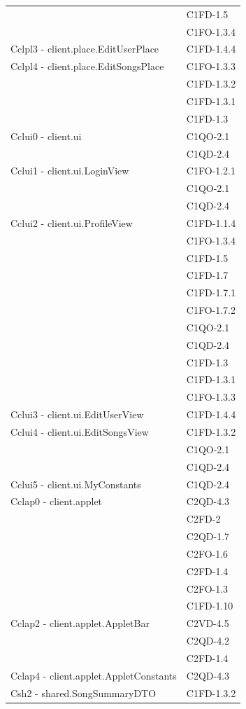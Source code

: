 \begin{footnotesize}
\begin{longtable}[!h]{|l|l|}
& C1FD-1.5 \\
& C1FO-1.3.4 \\\hline
Cclpl3 - client.place.EditUserPlace & C1FD-1.4.4 \\\hline
Cclpl4 - client.place.EditSongsPlace & C1FO-1.3.3 \\
& C1FD-1.3.2 \\
& C1FD-1.3.1 \\
& C1FD-1.3 \\ \hline
Cclui0 - client.ui & C1QO-2.1 \\
& C1QD-2.4 \\\hline
Cclui1 - client.ui.LoginView & C1FO-1.2.1 \\
& C1QO-2.1 \\
& C1QD-2.4 \\\hline
Cclui2 - client.ui.ProfileView & C1FD-1.1.4 \\
& C1FO-1.3.4 \\
& C1FD-1.5 \\
& C1FD-1.7 \\
& C1FD-1.7.1 \\
& C1FO-1.7.2 \\
& C1QO-2.1 \\
& C1QD-2.4 \\
& C1FD-1.3 \\
& C1FD-1.3.1 \\
& C1FO-1.3.3 \\\hline
Cclui3 - client.ui.EditUserView & C1FD-1.4.4 \\\hline
Cclui4 - client.ui.EditSongsView & C1FD-1.3.2 \\
& C1QO-2.1 \\
& C1QD-2.4 \\\hline
Cclui5 - client.ui.MyConstants & C1QD-2.4 \\\hline
Cclap0 - client.applet & C2QD-4.3 \\
& C2FD-2 \\
& C2QD-1.7 \\
& C2FO-1.6 \\
& C2FD-1.4 \\
& C2FO-1.3 \\\
& C1FD-1.10 \\\hline
Cclap2 - client.applet.AppletBar & C2VD-4.5\\
& C2QD-4.2 \\
& C2FD-1.4 \\\hline
Cclap4 - client.applet.AppletConstants & C2QD-4.3 \\\hline
Csh2 - shared.SongSummaryDTO & C1FD-1.3.2 \\

\end{longtable}
\end{footnotesize}
